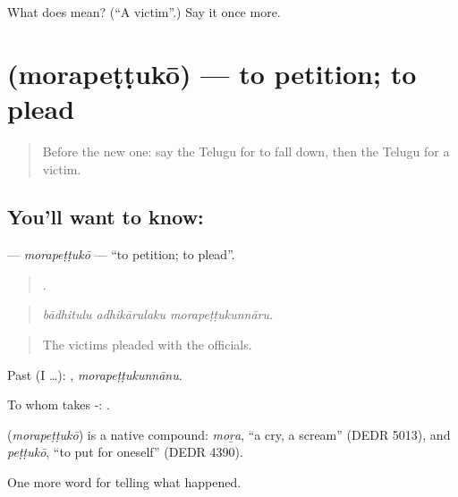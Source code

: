 \begin{tcolorbox}[breakable,colback=teal!4,colframe=teal!35!black,title={Before you move on}]
What does  mean? (\textquotedblleft{}A victim\textquotedblright{}.) Say it once more.
\end{tcolorbox}
\section[\texorpdfstring{\te{మొరపెట్టుకో} (morapeṭṭukō)}{మొరపెట్టుకో (morapeṭṭukō)}]{ (morapeṭṭukō) — to petition; to plead}

\label{lesson:TE-C379-morapettuko}



\begin{quote}
Before the new one: say the Telugu for to fall down, then the Telugu for a victim.
\end{quote}

\subsection*{You'll want to know: }
\textbf{} — \emph{morapeṭṭukō} — \textquotedblleft{}to petition; to plead\textquotedblright{}.

\begin{quote}
  .
\end{quote}

\begin{quote}
\emph{bādhitulu adhikārulaku morapeṭṭukunnāru.}
\end{quote}

\begin{quote}
The victims pleaded with the officials.
\end{quote}

Past (I …): , \emph{morapeṭṭukunnānu}.

To whom takes -:  .

\begin{cousinweb}
\textbf{} (\emph{morapeṭṭukō}) is a native compound: \emph{moṟa}, \textquotedblleft{}a cry, a scream\textquotedblright{} (DEDR 5013), and \emph{peṭṭukō}, \textquotedblleft{}to put for oneself\textquotedblright{} (DEDR 4390).
\end{cousinweb}

\begin{grammarlens}[title={What you've built}]
One more word for telling what happened.
\end{grammarlens}

